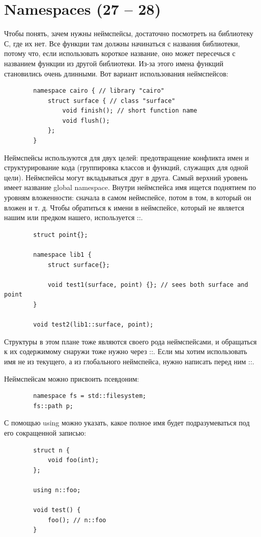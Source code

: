 \documentclass[12pt, a4paper]{article}
\begin{document}
	\section{Namespaces (27 -- 28)}
	Чтобы понять, зачем нужны неймспейсы, достаточно посмотреть на библиотеку С, где их нет. Все функции там должны начинаться с названия библиотеки, потому что, если использовать короткое название, оно может пересечься с названием функции из другой библиотеки. Из-за этого имена функций становились очень длинными. Вот вариант использования неймспейсов:
	\begin{verbatim}
		namespace cairo { // library "cairo"
			struct surface { // class "surface"
				void finish(); // short function name
				void flush();
			};
		}
	\end{verbatim}
	Неймспейсы используются для двух целей: предотвращение конфликта имен и структурирование кода (группировка классов и функций, служащих для одной цели). Неймспейсы могут вкладываться друг в друга. Самый верхний уровень имеет название global namespace. Внутри неймспейса имя ищется поднятием по уровням вложенности: сначала в самом неймспейсе, потом в том, в который он вложен и т. д. Чтобы обратиться к имени в неймспейсе, который не является нашим или предком нашего, используется ::.
	\begin{verbatim}
		struct point{};
		
		namespace lib1 {
			struct surface{};
			
			void test1(surface, point) {}; // sees both surface and point
		}
		
		void test2(lib1::surface, point);
	\end{verbatim}
	Структуры в этом плане тоже являются своего рода неймспейсами, и обращаться к их содержимому снаружи тоже нужно через ::. Если мы хотим использовать имя не из текущего, а из глобального неймспейса, нужно написать перед ним ::.
	\par Неймспейсам можно присвоить псевдоним:
	\begin{verbatim}
		namespace fs = std::filesystem;
		fs::path p;
	\end{verbatim}
	С помощью using можно указать, какое полное имя будет подразумеваться под его сокращенной записью:
	\begin{verbatim}
		struct n {
			void foo(int);
		};
		
		using n::foo;
		
		void test() {
			foo(); // n::foo
		}
	\end{verbatim}
\end{document}
